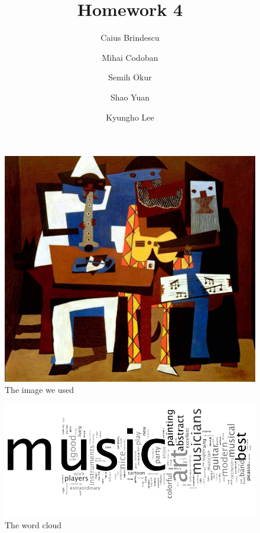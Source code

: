 \documentclass{article}
\title{Homework 4}
\author{Caius Brindescu \and Mihai Codoban \and Semih Okur \and Shao Yuan \and Kyungho Lee}
\begin{document}
\maketitle

\begin{figure}[hbt]
	\begin{center}
		\includegraphics{image.jpg}
	\end{center}
	\caption{The image we used}
	\label{fig:image}
\end{figure}

\begin{figure}[hbt]
	\includegraphics[width=\textwidth]{wordcloud.png}
	\caption{The word cloud}
	\label{fig:cloud}
\end{figure}
\end{document}

